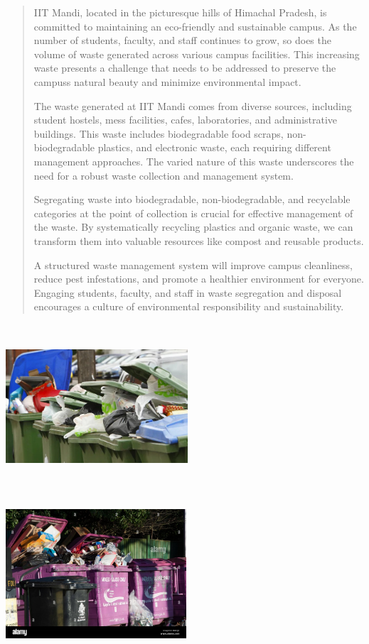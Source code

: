 \documentclass[
]{article}
\begin{document}
\begin{quote}
IIT Mandi, located in the picturesque hills of Himachal Pradesh, is
committed to maintaining an eco-friendly and sustainable campus. As the
number of students, faculty, and staff continues to grow, so does the
volume of waste generated across various campus facilities. This
increasing waste presents a challenge that needs to be addressed to
preserve the campus\textquotesingle s natural beauty and minimize
environmental impact.

The waste generated at IIT Mandi comes from diverse sources, including
student hostels, mess facilities, cafes, laboratories, and
administrative buildings. This waste includes biodegradable food scraps,
non-biodegradable plastics, and electronic waste, each requiring
different management approaches. The varied nature of this waste
underscores the need for a robust waste collection and management
system.

Segregating waste into biodegradable, non-biodegradable, and recyclable
categories at the point of collection is crucial for effective
management of the waste. By systematically recycling plastics and
organic waste, we can transform them into valuable resources like
compost and reusable products.

A structured waste management system will improve campus cleanliness,
reduce pest infestations, and promote a healthier environment for
everyone. Engaging students, faculty, and staff in waste segregation and
disposal encourages a culture of environmental responsibility and
sustainability.
\end{quote}

\includegraphics[width=2.66667in,height=2.41181in]{vertopal_24f0430788374a81b8d4c0bb6e5080ec/media/image3.jpeg}
\includegraphics[width=2.64167in,height=2.41181in]{vertopal_24f0430788374a81b8d4c0bb6e5080ec/media/image4.jpeg}
\end{document}
